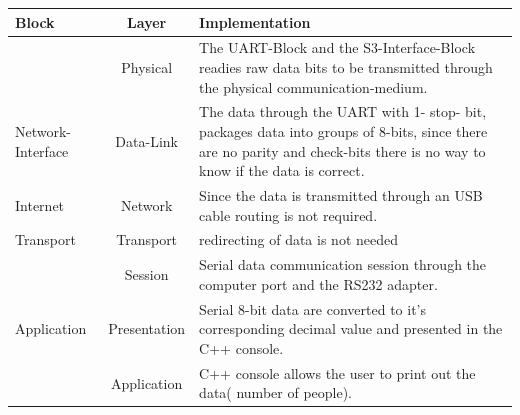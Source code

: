 \documentclass{article}
\begin{document}
\begin{center}
           \begin{tabular}{|p{2cm}|c|p{10cm}|}
        \hline 
        Block  &  Layer & Implementation \\
        \hline
        \hline
         & Physical &  The UART-Block and the S3-Interface-Block readies raw data bits to be transmitted through  the physical communication-medium.  \\
         
        Network-Interface   & Data-Link &  The data through the UART with  1- stop- bit, packages data into groups of 8-bits, since there are no parity and check-bits there is no way to know if the data is correct.\\
        \hline
        Internet &  Network &  Since the data is transmitted through an USB cable routing is not required.\\
        \hline
        Transport & Transport &   redirecting of data is not needed \\
        \hline
                 & Session  &    Serial data communication session through the computer port and the RS232 adapter. \\
        Application   & Presentation &   Serial 8-bit data are converted  to it's corresponding decimal value  and presented in the C++ console.        \\
                    & Application  & C++ console allows the user to print out the data( number of people).           \\
        \hline
        
          \end{tabular}
\end{center}
  
\end{document}
